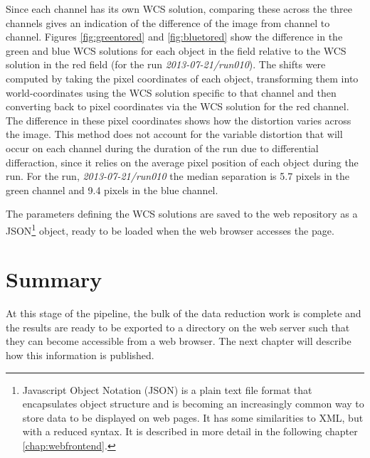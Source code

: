 Since each channel has its own WCS solution, comparing these across the three channels gives an indication of the difference of the image from channel to channel. Figures \ref{fig:greentored} and \ref{fig:bluetored} show the difference in the green and blue WCS solutions for each object in the field relative to the WCS solution in the red field (for the run \emph{2013-07-21/run010}). The shifts were computed by taking the pixel coordinates of each object, transforming them into world-coordinates using the WCS solution specific to that channel and then converting back to pixel coordinates via the WCS solution for the red channel. The difference in these pixel coordinates shows how the distortion varies across the image. This method does not account for the variable distortion that will occur on each channel during the duration of the run due to differential differaction, since it relies on the average pixel position of each object during the run.  For the run, \emph{2013-07-21/run010} the median separation is 5.7 pixels in the green channel and 9.4 pixels in the blue channel. 

The parameters defining the WCS solutions are saved to the web repository as a JSON\footnote{Javascript Object Notation (JSON) is a plain text file format that encapsulates object structure and is becoming an increasingly common way to store data to be displayed on web pages. It has some similarities to XML, but with a reduced syntax. It is described in more detail in the following chapter \ref{chap:webfrontend}.} object, ready to be loaded when the web browser accesses the page. 

\section{Summary}
At this stage of the pipeline, the bulk of the data reduction work is complete and the results are ready to be exported to a directory on the web server such that they can become accessible from a web browser. The next chapter will describe how this information is published.  
